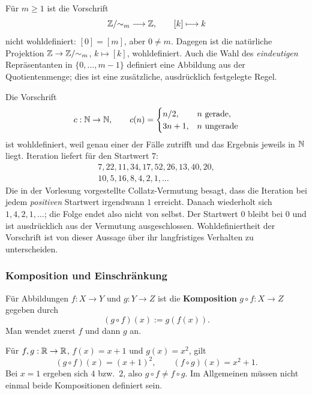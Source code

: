 \begin{beispiel}
Für $m\ge1$ ist die Vorschrift
\[
    \mathbb{Z}/{\sim_m}\longrightarrow\mathbb{Z},\qquad [k]\longmapsto k
\]
nicht wohldefiniert: $[0]=[m]$, aber $0\ne m$.
Dagegen ist die natürliche Projektion
$\mathbb{Z}\to\mathbb{Z}/{\sim_m}$, $k\mapsto[k]$, wohldefiniert.
Auch die Wahl des \emph{eindeutigen} Repräsentanten in
$\{0,\ldots,m-1\}$ definiert eine Abbildung aus der Quotientenmenge;
dies ist eine zusätzliche, ausdrücklich festgelegte Regel.
\end{beispiel}

\begin{beispiel}
Die Vorschrift
\[
    c:\mathbb{N}\to\mathbb{N},\qquad
    c(n)=\begin{cases}
        n/2,&n\text{ gerade},\\
        3n+1,&n\text{ ungerade}
    \end{cases}
\]
ist wohldefiniert, weil genau einer der Fälle zutrifft und das Ergebnis
jeweils in $\mathbb{N}$ liegt. Iteration liefert für den Startwert $7$:
\[
\begin{aligned}
    7,22,11,34,17,52,26,13,40,20,\\
    10,5,16,8,4,2,1,\ldots
\end{aligned}
\]
Die in der Vorlesung vorgestellte Collatz-Vermutung besagt, dass die
Iteration bei jedem \emph{positiven} Startwert irgendwann $1$ erreicht.
Danach wiederholt sich $1,4,2,1,\ldots$; die Folge endet also nicht
von selbst. Der Startwert $0$ bleibt bei $0$ und ist ausdrücklich
aus der Vermutung ausgeschlossen. Wohldefiniertheit der Vorschrift
ist von dieser Aussage über ihr langfristiges Verhalten zu unterscheiden.
\end{beispiel}

\subsubsection*{Komposition und Einschränkung}
\begin{definition}[Komposition]
Für Abbildungen $f:X\to Y$ und $g:Y\to Z$ ist die
\textbf{Komposition} $g\circ f:X\to Z$ gegeben durch
\[
    (g\circ f)(x):=g(f(x)).
\]
Man wendet zuerst $f$ und dann $g$ an.
\end{definition}

\begin{beispiel}
Für $f,g:\mathbb{R}\to\mathbb{R}$, $f(x)=x+1$ und $g(x)=x^2$, gilt
\[
    (g\circ f)(x)=(x+1)^2,
    \qquad (f\circ g)(x)=x^2+1.
\]
Bei $x=1$ ergeben sich $4$ bzw.\ $2$, also $g\circ f\ne f\circ g$.
Im Allgemeinen müssen nicht einmal beide Kompositionen definiert sein.
\end{beispiel}

